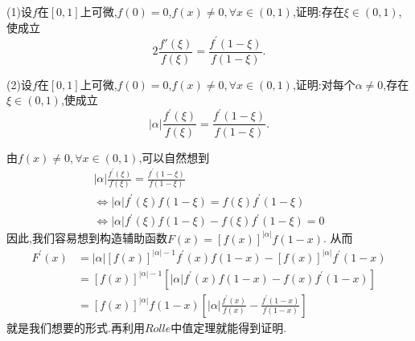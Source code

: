 \documentclass[lang=cn,newtx,10pt,scheme=chinese]{../Template/elegantbook}
\begin{document}
\begin{exercise}
    (1)设\(f\)在\([0,1]\)上可微,\(f(0)=0\),\(f(x)\neq0,\forall x\in(0,1)\),证明:存在\(\xi\in(0,1)\),使成立
    \begin{equation}
        2\frac{f'(\xi)}{f(\xi)}=\frac{f^{\prime}(1-\xi)}{f(1-\xi)}.
        \nonumber
    \end{equation}

(2)设\(f\)在\([0,1]\)上可微,\(f(0)=0\),\(f(x)\neq0,\forall x\in(0,1)\),证明:对每个\(\alpha\neq0\),存在\(\xi\in(0,1)\),使成立
\begin{equation}
        \vert\alpha\vert\frac{f^{\prime}(\xi)}{f(\xi)}=\frac{f^{\prime}(1-\xi)}{f(1-\xi)}.
        \nonumber
    \end{equation}
\end{exercise}
\begin{note}
    由$f(x)\ne0,\forall x\in(0,1)$,可以自然想到
    \begin{gather}
            \left| \alpha \right|\frac{f^{\prime}(\xi )}{f(\xi )}=\frac{f^{\prime}(1-\xi )}{f(1-\xi )}
            \nonumber
            \\ \nonumber
\Leftrightarrow \left| \alpha \right|f^{\prime}(\xi )f(1-\xi )=f(\xi )f^{\prime}(1-\xi )
\\\nonumber
\Leftrightarrow \left| \alpha \right|f^{\prime}(\xi )f(1-\xi )-f(\xi )f^{\prime}(1-\xi )=0
    \end{gather}
    因此,我们容易想到构造辅助函数$F\left( x \right) =\left[ f\left( x \right) \right] ^{\left| \alpha \right|}f\left( 1-x \right)$.
    从而
    \begin{equation}
        \begin{split}
            F^{\prime}\left( x \right) &=\left| \alpha \right|\left[ f\left( x \right) \right] ^{\left| \alpha \right|-1}f^{\prime}(x)f(1-x)-\left[ f\left( x \right) \right] ^{\left| \alpha \right|}f^{\prime}(1-x)
\\
&=\left[ f\left( x \right) \right] ^{\left| \alpha \right|-1}\left[ \left| \alpha \right|f^{\prime}(x)f(1-x)-f(x)f^{\prime}(1-x) \right]
\\
&=\left[ f\left( x \right) \right] ^{\left| \alpha \right|}f(1-x)\left[ \left| \alpha \right|\frac{f^{\prime}(x)}{f(x)}-\frac{f^{\prime}(1-x)}{f(1-x)} \right]        
\end{split}
        \nonumber
    \end{equation}
    就是我们想要的形式.再利用$Rolle$中值定理就能得到证明.
\end{note}
\end{document}
